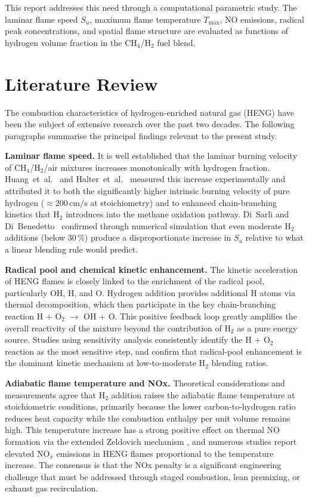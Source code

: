 \documentclass[12pt,a4paper]{article}
\begin{document}
This report addresses this need through a computational parametric study. The
laminar flame speed $S_u$, maximum flame temperature $T_\mathrm{max}$, NO
emissions, radical peak concentrations, and spatial flame structure are evaluated
as functions of hydrogen volume fraction in the CH$_4$/H$_2$ fuel blend.

\section{Literature Review}
\label{sec:lit}

The combustion characteristics of hydrogen-enriched natural gas (HENG) have been
the subject of extensive research over the past two decades. The following
paragraphs summarise the principal findings relevant to the present study.

\textbf{Laminar flame speed.} It is well established that the laminar burning
velocity of CH$_4$/H$_2$/air mixtures increases monotonically with hydrogen
fraction. Huang~et~al.~\cite{Huang2006} and Halter~et~al.~\cite{Halter2005}
measured this increase experimentally and attributed it to both the significantly
higher intrinsic burning velocity of pure hydrogen ($\approx 200\,\mathrm{cm/s}$
at stoichiometry) and to enhanced chain-branching kinetics that H$_2$ introduces
into the methane oxidation pathway. Di~Sarli and Di~Benedetto~\cite{DiSarli2007}
confirmed through numerical simulation that even moderate H$_2$ additions (below
30\,\%) produce a disproportionate increase in $S_u$ relative to what a linear
blending rule would predict.

\textbf{Radical pool and chemical kinetic enhancement.} The kinetic
acceleration of HENG flames is closely linked to the enrichment of the radical
pool, particularly OH, H, and O. Hydrogen addition provides additional H atoms
via thermal decomposition, which then participate in the key chain-branching
reaction H + O$_2$ $\rightarrow$ OH + O. This positive feedback loop greatly
amplifies the overall reactivity of the mixture beyond the contribution of H$_2$
as a pure energy source. Studies using sensitivity analysis
\cite{Schefer2002,Coppens2007} consistently identify the H + O$_2$ reaction as
the most sensitive step, and confirm that radical-pool enhancement is the dominant
kinetic mechanism at low-to-moderate H$_2$ blending ratios.

\textbf{Adiabatic flame temperature and NOx.} Theoretical considerations and
measurements agree that H$_2$ addition raises the adiabatic flame temperature at
stoichiometric conditions, primarily because the lower carbon-to-hydrogen ratio
reduces heat capacity while the combustion enthalpy per unit volume remains high.
This temperature increase has a strong positive effect on thermal NO formation via
the extended Zeldovich mechanism \cite{Zeldovich1947}, and numerous studies
\cite{Guo2010,Zhang2007} report elevated NO$_x$ emissions in HENG flames
proportional to the temperature increase. The consensus is that the NOx penalty
is a significant engineering challenge that must be addressed through staged
combustion, lean premixing, or exhaust gas recirculation.
\end{document}
